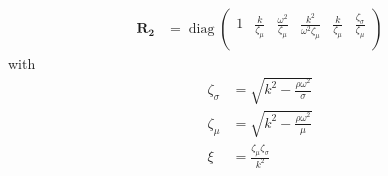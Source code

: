 \documentclass[a4paper,10pt]{article}
\DeclareMathOperator{\diag}{diag}
\begin{document}
\begin{align}
\mathbf{R_2} &=\diag\left(
\begin{array}{cccccc}
 1 &  \frac{k}{\zeta _{\mu }} &  \frac{\omega ^2}{\zeta _{\mu }} &  \frac{k^2}{\omega ^2 \zeta _{\mu }} &  \frac{k}{\zeta _{\mu }} &  \frac{\zeta _{\sigma }}{\zeta _{\mu }} \\
\end{array}
\right)\end{align}
with
\begin{align*}
\zeta_\sigma &= \sqrt{k^2 - \frac{\rho \omega^2}{\sigma}}\\
\zeta_\mu &= \sqrt{k^2 - \frac{\rho \omega^2}{\mu}}\\
\xi &= \frac{\zeta_\mu\zeta_\sigma}{k^2}
\end{align*}
\end{document}
